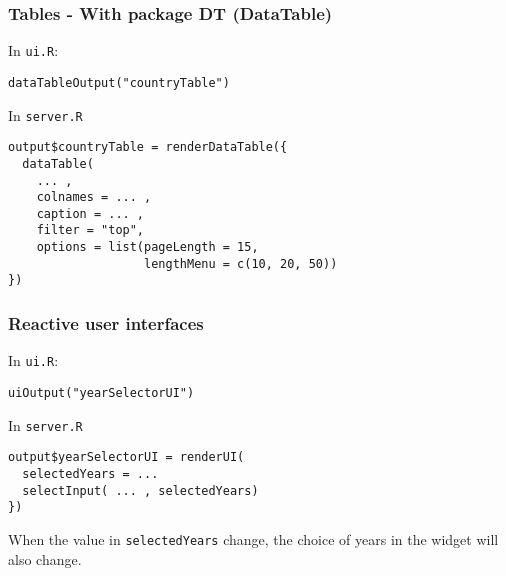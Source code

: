 \documentclass{beamer}
\begin{document}
	\begin{frame}[fragile]
		\frametitle{Tables - With package DT (DataTable)}
		
		In \verb|ui.R|:
		\begin{exampleblock}{}
		\begin{BVerbatim}
dataTableOutput("countryTable")
		\end{BVerbatim}
		\end{exampleblock}{}

		\vspace{1em}

		In \verb|server.R|
		\begin{exampleblock}{}
		\begin{BVerbatim}
output$countryTable = renderDataTable({
  dataTable(
    ... ,
    colnames = ... ,
    caption = ... ,
    filter = "top",
    options = list(pageLength = 15,
                   lengthMenu = c(10, 20, 50))
})
		\end{BVerbatim}
		\end{exampleblock}{}

	\end{frame}

	\begin{frame}[fragile]
		\frametitle{Reactive user interfaces}
		
		In \verb|ui.R|:
		\begin{exampleblock}{}
		\begin{BVerbatim}
uiOutput("yearSelectorUI")
		\end{BVerbatim}
		\end{exampleblock}{}

		\vspace{1em}

		In \verb|server.R|
		\begin{exampleblock}{}
		\begin{BVerbatim}
output$yearSelectorUI = renderUI(
  selectedYears = ...
  selectInput( ... , selectedYears)
})
		\end{BVerbatim}
		\end{exampleblock}{}

		\vspace{1em}

		When the value in \verb|selectedYears| change, the choice of years in the widget will also change.

	\end{frame}
\end{document}
